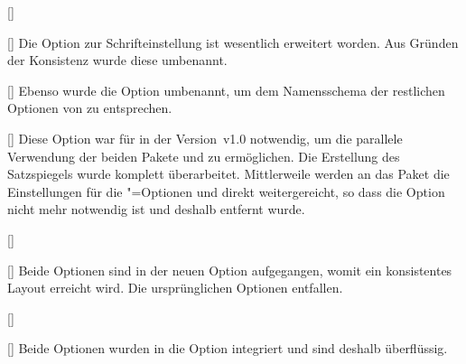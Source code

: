 \begin{Declaration}[v2.00]{[\PBoolean]}
\begin{Declaration}[v2.00]{[\PBoolean]}
%
Die Option zur Schrifteinstellung ist wesentlich erweitert worden. Aus Gründen 
der Konsistenz wurde diese umbenannt.
\end{Declaration}
\end{Declaration}

\begin{Declaration}[v2.00]{[\PBoolean]}
%
Ebenso wurde die Option  umbenannt, um dem Namensschema der 
restlichen Optionen von \TUDScript zu entsprechen.
\end{Declaration}

\begin{Declaration}[v2.00]{[\PSet]}
%
Diese Option war für \TUDScript in der Version~v1.0 notwendig, um die parallele 
Verwendung der beiden Pakete  und  zu 
ermöglichen. Die Erstellung des Satzspiegels wurde komplett überarbeitet. 
Mittlerweile werden an das Paket  die Einstellungen für die 
\KOMAScript"=Optionen  und  direkt 
weitergereicht, so dass die Option  nicht mehr notwendig ist 
und deshalb entfernt wurde.
\end{Declaration}

\begin{Declaration}[v2.00]{[\PBoolean]}
\begin{Declaration}[v2.00]{[\PBoolean]}
%
Beide Optionen sind in der neuen Option  
aufgegangen, womit ein konsistentes Layout erreicht wird. Die ursprünglichen 
Optionen entfallen. 
\end{Declaration}
\end{Declaration}

\begin{Declaration}[v2.00]{[\PBoolean]}
\begin{Declaration}[v2.00]{[\PBoolean]}
%
Beide Optionen wurden in die Option  integriert und sind 
deshalb überflüssig.
\end{Declaration}
\end{Declaration}

